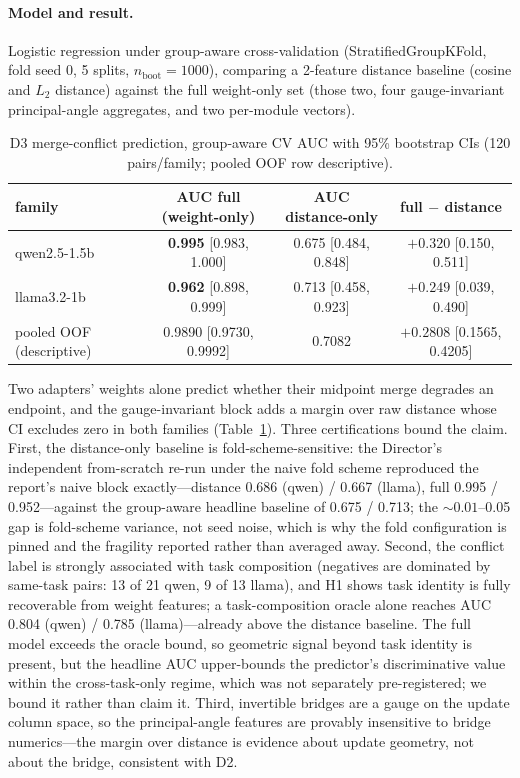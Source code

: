 \documentclass[10pt]{article}
\begin{document}
\paragraph{Model and result.} Logistic regression under group-aware
cross-validation (StratifiedGroupKFold, fold seed 0, 5 splits,
$n_{\mathrm{boot}} = 1000$), comparing a 2-feature distance baseline
(cosine and $L_2$ distance) against the full weight-only set (those two,
four gauge-invariant principal-angle aggregates, and two per-module
vectors).

\begin{table}[ht]
\centering
\caption{D3 merge-conflict prediction, group-aware CV AUC with 95\%
bootstrap CIs (120 pairs/family; pooled OOF row descriptive).}
\label{tab:d3}
\small
\begin{tabular}{lccc}
\toprule
family & AUC full (weight-only) & AUC distance-only & full $-$ distance \\
\midrule
qwen2.5-1.5b & \textbf{0.995} [0.983, 1.000] & 0.675 [0.484, 0.848] & $+0.320$ [0.150, 0.511] \\
llama3.2-1b & \textbf{0.962} [0.898, 0.999] & 0.713 [0.458, 0.923] & $+0.249$ [0.039, 0.490] \\
pooled OOF (descriptive) & 0.9890 [0.9730, 0.9992] & 0.7082 & $+0.2808$ [0.1565, 0.4205] \\
\bottomrule
\end{tabular}
\end{table}

Two adapters' weights alone predict whether their midpoint merge degrades
an endpoint, and the gauge-invariant block adds a margin over raw distance
whose CI excludes zero in both families (Table~\ref{tab:d3}). Three
certifications bound the claim. First, the distance-only baseline is
fold-scheme-sensitive: the Director's independent from-scratch re-run
under the naive fold scheme reproduced the report's naive block
exactly---distance 0.686 (qwen) / 0.667 (llama), full 0.995 /
0.952---against the group-aware headline baseline of 0.675 / 0.713; the
${\sim}0.01$--0.05 gap is fold-scheme variance, not seed noise, which is
why the fold configuration is pinned and the fragility reported rather
than averaged away. Second, the conflict label is strongly associated with
task composition (negatives are dominated by same-task pairs: 13 of 21
qwen, 9 of 13 llama), and H1 shows task identity is fully recoverable from
weight features; a task-composition oracle alone reaches AUC 0.804 (qwen)
/ 0.785 (llama)---already above the distance baseline. The full model
exceeds the oracle bound, so geometric signal beyond task identity is
present, but the headline AUC upper-bounds the predictor's discriminative
value within the cross-task-only regime, which was not separately
pre-registered; we bound it rather than claim it. Third, invertible
bridges are a gauge on the update column space, so the principal-angle
features are provably insensitive to bridge numerics---the margin over
distance is evidence about update geometry, not about the bridge,
consistent with D2.
\end{document}
